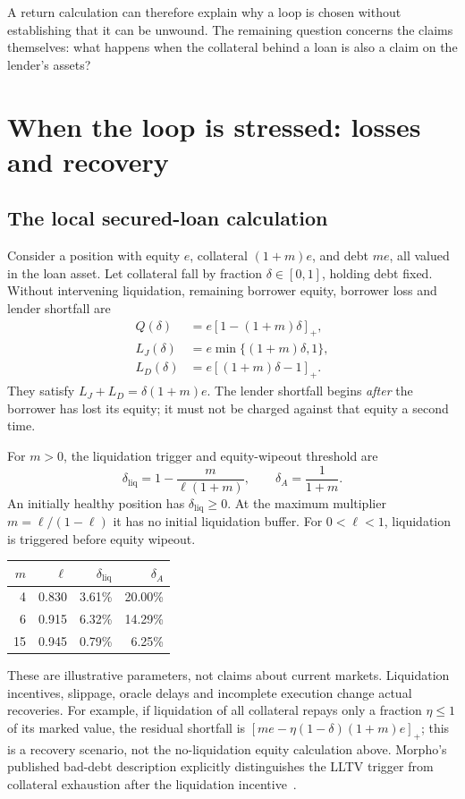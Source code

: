 \documentclass[12pt,oneside]{article}
\newcommand{\pos}[1]{\left[#1\right]_+}
\begin{document}
A return calculation can therefore explain why a loop is chosen without
establishing that it can be unwound. The remaining question concerns
the claims themselves: what happens when the collateral behind a loan
is also a claim on the lender's assets?

\section{When the loop is stressed: losses and recovery}
\label{sec:loss}
\subsection{The local secured-loan calculation}
Consider a position with equity $e$, collateral $(1+m)e$, and debt
$me$, all valued in the loan asset. Let collateral fall by fraction
$\delta\in[0,1]$, holding debt fixed. Without intervening liquidation,
remaining borrower equity, borrower loss and lender shortfall are
\begin{align*}
 Q(\delta)&=e\pos{1-(1+m)\delta},\\
 L_J(\delta)&=e\min\{(1+m)\delta,1\},\\
 L_D(\delta)&=e\pos{(1+m)\delta-1}.
\end{align*}
They satisfy $L_J+L_D=\delta(1+m)e$. The lender shortfall begins
\emph{after} the borrower has lost its equity; it must not be charged
against that equity a second time.

For $m>0$, the liquidation trigger and equity-wipeout threshold are
\begin{equation}
 \boxed{\delta_{\mathrm{liq}}=1-\frac{m}{\ell(1+m)},\qquad
        \delta_A=\frac{1}{1+m}.}
 \label{eq:thresholds}
\end{equation}
An initially healthy position has $\delta_{\mathrm{liq}}\geq0$.
At the maximum multiplier $m=\ell/(1-\ell)$ it has no initial
liquidation buffer. For $0<\ell<1$, liquidation is triggered before
equity wipeout.

\begin{center}
\begin{tabular}{rrrr}
\toprule
$m$ & $\ell$ & $\delta_{\mathrm{liq}}$ & $\delta_A$\\
\midrule
4 & 0.830 & 3.61\% & 20.00\%\\
6 & 0.915 & 6.32\% & 14.29\%\\
15 & 0.945 & 0.79\% & 6.25\%\\
\bottomrule
\end{tabular}
\end{center}
These are illustrative parameters, not claims about current markets.
Liquidation incentives, slippage, oracle delays and incomplete execution
change actual recoveries. For example, if liquidation of all collateral
repays only a fraction $\eta\leq1$ of its marked value, the residual
shortfall is $\pos{me-\eta(1-\delta)(1+m)e}$; this is a recovery
scenario, not the no-liquidation equity calculation above. Morpho's
published bad-debt description explicitly distinguishes the LLTV trigger
from collateral exhaustion after the liquidation
incentive~\cite{morpho}.
\end{document}
